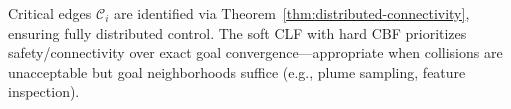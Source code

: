 \begin{remark}
Critical edges $\mathcal{C}_i$ are identified via Theorem~\ref{thm:distributed-connectivity}, ensuring fully distributed control. The soft CLF with hard CBF prioritizes safety/connectivity over exact goal convergence—appropriate when collisions are unacceptable but goal neighborhoods suffice (e.g., plume sampling, feature inspection).
\end{remark}